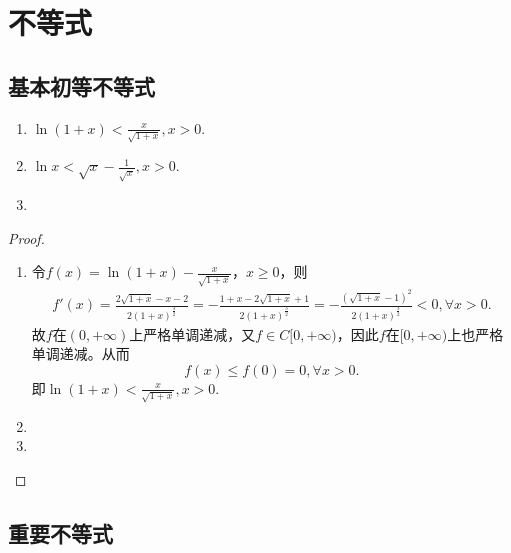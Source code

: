 \documentclass[lang=cn,newtx,10pt,scheme=chinese]{elegantbook}
\begin{document}
\chapter{不等式}

\section{基本初等不等式}

\begin{proposition}[关于ln的常用不等式]\label{proposition:关于ln的常用不等式}
\begin{enumerate}[(1)]
\item\label{proposition:关于ln的常用不等式1} $\ln \left( 1+x \right) <\frac{x}{\sqrt{1+x}},x>0.$

\item \label{proposition:关于ln的常用不等式2} $\ln x<\sqrt{x}-\frac{1}{\sqrt{x}},x>0.$

\item \label{proposition:关于ln的常用不等式3}
\end{enumerate}
\end{proposition}
\begin{proof}
\begin{enumerate}[(1)]
\item 令\(f(x)=\ln(1 + x)-\frac{x}{\sqrt{1 + x}}\)，\(x\geqslant 0\)，则
\begin{align*}
f'\left( x \right) =\frac{2\sqrt{1+x}-x-2}{2\left( 1+x \right) ^{\frac{3}{2}}}=-\frac{1+x-2\sqrt{1+x}+1}{2\left( 1+x \right) ^{\frac{3}{2}}}=-\frac{\left( \sqrt{1+x}-1 \right) ^2}{2\left( 1+x \right) ^{\frac{3}{2}}}<0,\forall x>0.
\end{align*}
故\(f\)在\((0,+\infty)\)上严格单调递减，又\(f\in C[0,+\infty)\)，因此\(f\)在\([0,+\infty)\)上也严格单调递减。从而
\[
f(x)\leqslant f(0)=0,\forall x>0.
\]
即\(\ln(1 + x)<\frac{x}{\sqrt{1 + x}},x>0\).

\item 

\item 
\end{enumerate}
\end{proof}




\section{重要不等式}
\end{document}
